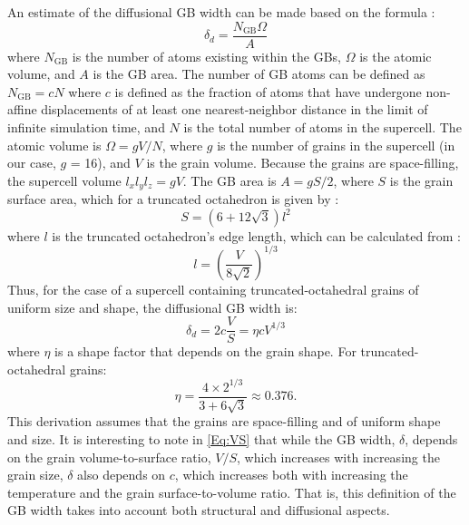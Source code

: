 \documentclass[preprint, 12pt]{elsarticle}
\newcommand{\?}{\stackrel{?}{=}}
\begin{document}
An estimate of the diffusional GB width can be made based on the formula \cite{Keblinski1999}:
\begin{equation}
\delta_d = \frac{N_{\mathrm{GB}} \Omega}{A} 
\label{Eq:dNGB}
\end{equation}
where $N_{\mathrm{GB}}$ is the number of atoms existing within the GBs, $\Omega$ is the atomic volume, and $A$ is the GB area. The number of GB atoms can be defined as $N_\mathrm{GB} = c N$ \cite{Haslam2004} where $c$ is defined as the fraction of atoms that have undergone non-affine displacements of at least one nearest-neighbor distance in the limit of infinite simulation time, and $N$ is the total number of atoms in the supercell. The atomic volume is $\Omega = gV/N$, where $g$ is the number of grains in the supercell (in our case, $g$ = 16), and $V$ is the grain volume. Because the grains are space-filling, the supercell volume $l_x l_y l_z = gV$. The GB area is $A = g S / 2$, where $S$ is the grain surface area, which for a truncated octahedron is given by \cite{Weisstein}:
\begin{equation}
S = \left( 6 + 12 \sqrt{3} \right) l^2    
\end{equation}
where $l$ is the truncated octahedron's edge length, which can be calculated from \cite{Weisstein}:
\begin{equation}
l = \left( \frac{V}{8 \sqrt{2}} \right)^{1/3}
\end{equation}
Thus, for the case of a supercell containing truncated-octahedral grains of uniform size and shape, the diffusional GB width is:
\begin{equation}
\delta_d = 2 c \frac{V}{S} = \eta c V^{1/3}
\label{Eq:VS}
\end{equation}
where $\eta$ is a shape factor that depends on the grain shape. For truncated-octahedral grains:
\begin{equation}
\eta = \frac{4 \times 2^{1/3}}{3 + 6 \sqrt{3}} \approx 0.376.
\end{equation}
This derivation assumes that the grains are space-filling and of uniform shape and size. It is interesting to note in \cref{Eq:VS} that while the GB width, $\delta$, depends on the grain volume-to-surface ratio, $V/S$, which increases with increasing the grain size, $\delta$ also depends on $c$, which increases both with increasing the temperature and the grain surface-to-volume ratio. That is, this definition of the GB width takes into account both structural and diffusional aspects.



\end{document}
